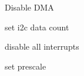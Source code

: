 \begin{DoxyItemize}
\item Disable D\+MA ~\newline
~\newline
~\newline
~\newline
~\newline
~\newline
~\newline
~\newline
~\newline
~\newline
~\newline
~\newline
~\newline

\item set i2c data count ~\newline
~\newline
~\newline
~\newline
~\newline
~\newline
~\newline
~\newline
~\newline
~\newline
~\newline
~\newline

\item disable all interrupts ~\newline
~\newline
~\newline
~\newline
~\newline
~\newline
~\newline
~\newline
~\newline
~\newline
~\newline

\item set prescale ~\newline
~\newline
~\newline
~\newline
~\newline
~\newline
~\newline
~\newline
~\newline
~\newline


\end{DoxyItemize}
